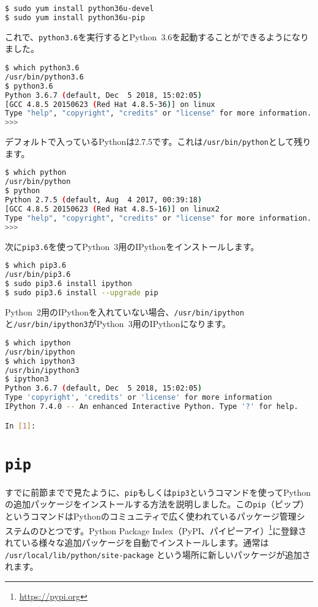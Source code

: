 \begin{lstlisting}[language=bash]
$ sudo yum install python36u-devel
$ sudo yum install python36u-pip
\end{lstlisting}

これで、\texttt{python3.6}を実行するとPython~3.6を起動することができるようになりました。
\begin{lstlisting}[language=bash]
$ which python3.6
/usr/bin/python3.6
$ python3.6
Python 3.6.7 (default, Dec  5 2018, 15:02:05) 
[GCC 4.8.5 20150623 (Red Hat 4.8.5-36)] on linux
Type "help", "copyright", "credits" or "license" for more information.
>>> 
\end{lstlisting}

デフォルトで入っているPythonは2.7.5です。これは\texttt{/usr/bin/python}として残ります。
\begin{lstlisting}[language=bash]
$ which python
/usr/bin/python
$ python
Python 2.7.5 (default, Aug  4 2017, 00:39:18) 
[GCC 4.8.5 20150623 (Red Hat 4.8.5-16)] on linux2
Type "help", "copyright", "credits" or "license" for more information.
>>> 
\end{lstlisting}

次に\texttt{pip3.6}を使ってPython~3用のIPythonをインストールします。

\begin{lstlisting}[language=bash]
$ which pip3.6 
/usr/bin/pip3.6
$ sudo pip3.6 install ipython
$ sudo pip3.6 install --upgrade pip
\end{lstlisting}

Python~2用のIPythonを入れていない場合、\texttt{/usr/bin/ipython}と\texttt{/usr/bin/ipython3}がPython~3用のIPythonになります。

\begin{lstlisting}[language=bash]
$ which ipython
/usr/bin/ipython
$ which ipython3
/usr/bin/ipython3
$ ipython3 
Python 3.6.7 (default, Dec  5 2018, 15:02:05) 
Type 'copyright', 'credits' or 'license' for more information
IPython 7.4.0 -- An enhanced Interactive Python. Type '?' for help.

In [1]:
\end{lstlisting}

\section{\texttt{pip}}

すでに前節までで見たように、\texttt{pip}もしくは\texttt{pip3}というコマンドを使ってPythonの追加パッケージをインストールする方法を説明しました。この\texttt{pip}（ピップ）というコマンドはPythonのコミュニティで広く使われているパッケージ管理システムのひとつです。Python Package Index（PyPI、パイピーアイ）\footnote{\url{https://pypi.org}}に登録されている様々な追加パッケージを自動でインストールします。通常は \texttt{/usr/local/lib/python/site-package} という場所に新しいパッケージが追加されます。

